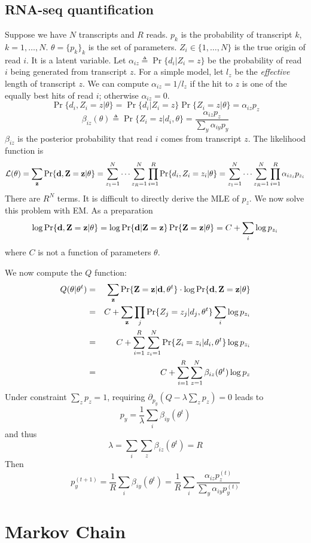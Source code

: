 \documentclass[10pt]{article}
\begin{document}
\subsection{RNA-seq quantification}
Suppose we have $N$ transcripts and $R$ reads. $p_k$ is the probability of
transcript $k$, $k=1,\ldots,N$. $\theta=\{p_k\}_k$ is the set of parameters.
$Z_i\in\{1,\ldots,N\}$ is the true origin of read $i$. It is a latent variable.
Let $\alpha_{iz}\triangleq\Pr\{d_i|Z_i=z\}$ be the probability of read $i$
being generated from transcript $z$. For a simple model, let $l_z$ be the
\emph{effective} length of transcript $z$. We can compute $\alpha_{iz}=1/l_z$
if the hit to $z$ is one of the equally best hits of read $i$; otherwise
$\alpha_{iz}=0$.
\[
\Pr\{d_i,Z_i=z|\theta\}=\Pr\{d_i|Z_i=z\}\Pr\{Z_i=z|\theta\}=\alpha_{iz}p_z
\]
\[
\beta_{iz}(\theta)\triangleq\Pr\{Z_i=z|d_i,\theta\}=\frac{\alpha_{iz}p_z}{\sum_{y}\alpha_{iy}p_y}
\]
$\beta_{iz}$ is the posterior probability that read $i$ comes from transcript
$z$. The likelihood function is
$$
\mathcal{L}(\theta)=\sum_{\bf z}\Pr\{{\bf d},{\bf Z}={\bf z}|\theta\}=\sum_{z_1=1}^N\cdots\sum_{z_R=1}^N\prod_{i=1}^R\Pr\{d_i,Z_i=z_i|\theta\}
=\sum_{z_1=1}^N\cdots\sum_{z_R=1}^N\prod_{i=1}^R\alpha_{iz_i}p_{z_i}
$$
There are $R^N$ terms. It is difficult to directly derive the MLE of $p_z$.
We now solve this problem with EM. As a preparation
\[
\log\Pr\{{\bf d},{\bf Z}={\bf z}|\theta\}=\log\Pr\{{\bf d}|{\bf Z}={\bf z}\}\Pr\{{\bf Z}={\bf z}|\theta\}=C+\sum_i\log p_{z_i}
\]
where $C$ is not a function of parameters $\theta$.

We now compute the $Q$ function:
\begin{eqnarray*}
Q(\theta|\theta^t)&=&\sum_{{\bf z}}\Pr\{{\bf Z}={\bf z}|{\bf d},\theta^t\}\cdot\log\Pr\{{\bf d},{\bf Z}={\bf z}|\theta\}\\
&=&C+\sum_{{\bf z}}\prod_j\Pr\{Z_j=z_j|d_j,\theta^t\}\sum_i\log p_{z_i}\\
&=&C+\sum_{i=1}^R\sum_{z_i=1}^N\Pr\{Z_i=z_i|d_i,\theta^t\}\log p_{z_i}\\
&=&C+\sum_{i=1}^R\sum_{z=1}^N\beta_{iz}(\theta^t)\log p_z
\end{eqnarray*}
Under constraint $\sum_zp_z=1$, requiring
$\partial_{p_y}(Q-\lambda\sum_zp_z)=0$ leads to
\[
p_y=\frac{1}{\lambda}\sum_i\beta_{iy}(\theta^t)
\]
and thus
\[
\lambda=\sum_i\sum_z\beta_{iz}(\theta^t)=R
\]
Then
\[
p_y^{(t+1)}=\frac{1}{R}\sum_i\beta_{iy}(\theta^t)=\frac{1}{R}\sum_i\frac{\alpha_{iz}p^{(t)}_z}{\sum_{y}\alpha_{iy}p^{(t)}_y}
\]
\section{Markov Chain}
\end{document}

